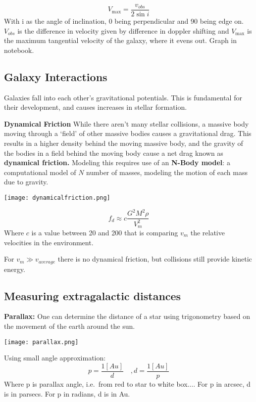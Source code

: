 \begin{equation}
	\label{}
	V_{\max}=\frac{v_{obs}}{2\sin{i}}
\end{equation}
With i as the angle of inclination, 0 being perpendicular and 90 being edge on. $V_{obs}$ is the difference in velocity given by difference in doppler shifting and $V_{\max}$ is the maximum tangential velocity of the galaxy, where it evens out. Graph in notebook.


\subsection{Galaxy Interactions}
Galaxies fall into each other's gravitational potentials. This is fundamental for their development, and causes increases in stellar formation. 

\textbf{Dynamical Friction} While there aren't many stellar collisions, a massive body moving through a `field' of other massive bodies causes a gravitational drag. This results in a higher density behind the moving massive body, and the gravity of the bodies in a field behind the moving body cause a net drag known as \textbf{dynamical friction.} Modeling this requires use of an \textbf{N-Body model}: a computational model of $N$ number of masses, modeling the motion of each mass due to gravity.

\texttt{[image: dynamicalfriction.png]}

\begin{equation}
	\label{}
	f_{d}\approx c\frac{G^{2}M^{2}\rho}{V_{m}^{2}}
\end{equation}
Where $c$ is a value between 20 and 200 that is comparing $v_{m}$ the relative velocities in the environment. 

For $v_{m}\gg v_{average}$ there is no dynamical friction, but collisions still provide kinetic energy.



\subsection{Measuring extragalactic distances}

\textbf{Parallax:} One can determine the distance of a star using trigonometry based on the movement of the earth around the sun. 

\texttt{[image: parallax.png]}


Using small angle approximation:
\begin{equation}
	\label{}
	p=\frac{1[Au]}{d}\quad, d=\frac{1[Au]}{p}
\end{equation}
Where p is parallax angle, i.e.\ from red to star to white box$\ldots$. For p in arcsec, d is in parsecs. For p in radians, d is in Au.

